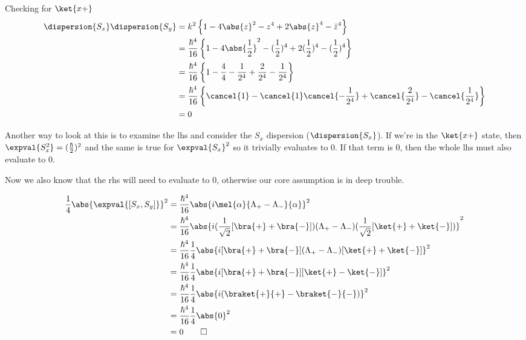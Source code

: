 \begin{answer}
\begin{answerpart}{Checking for \texorpdfstring{$\ket{x+}$}{|x+>}}
    \begin{equation}
      \begin{split}
        \dispersion{S_x}\dispersion{S_y}
        &=
        k^2
        \left\{
        1
        - 4\abs{z}^2
        - z^4 + 2\abs{z}^4 - \bar{z}^4
        \right\}
        \\
        &=
        \frac{\hbar^4}{16}        
        \left\{
        1
        - 4\abs{\frac{1}{2}}^2
        - (\frac{1}{2})^4 + 2(\frac{1}{2})^4 - (\frac{1}{2})^4
        \right\}
        \\
        &=
        \frac{\hbar^4}{16}
        \left\{
        1
        - \frac{4}{4}
        - \frac{1}{2^4} + \frac{2}{2^4} - \frac{1}{2^4}
        \right\}
        \\
        &=
        \frac{\hbar^4}{16}
        \left\{
        \cancel{1}
        - \cancel{1}
        \cancel{- \frac{1}{2^4}} + \cancel{\frac{2}{2^4}} - \cancel{\frac{1}{2^4}}
        \right\}
        \\
        &= 0\\
      \end{split}
    \end{equation}

    Another way to look at this is to examine the \ac{lhs} and
    consider the $S_x$ dispersion ($\dispersion{S_x}$).  If we're in
    the $\ket{x+}$ state, then $\expval{S_x^2} = (\frac{\hbar}{2})^2$
    and the same is true for $\expval{S_x}^2$ so it trivially
    evaluates to 0.  If that term is 0, then the whole \ac{lhs} must
    also evaluate to 0.

    Now we also know that the \ac{rhs} will need to evaluate to 0,
    otherwise our core assumption is in deep trouble.

    \begin{equation}
      \begin{split}
        \frac{1}{4}\abs{\expval{[S_x, S_y]}}^2
        &=
        \frac{\hbar^4}{16}
        \abs{i\mel{\alpha}{\Lambda_+ - \Lambda_-}{\alpha}}^2\\
        &=
        \frac{\hbar^4}{16}
        \abs{i
          (\frac{1}{\sqrt{2}} [\bra{+} + \bra{-}])
          (\Lambda_+ - \Lambda_-)
          (\frac{1}{\sqrt{2}} [\ket{+} + \ket{-}])
          }^2\\
        &=
        \frac{\hbar^4}{16}
        \frac{1}{4}
        \abs{i
          [\bra{+} + \bra{-}]
          (\Lambda_+ - \Lambda_-)
          [\ket{+} + \ket{-}]
          }^2\\
        &=
        \frac{\hbar^4}{16}
        \frac{1}{4}
        \abs{i
          [\bra{+} + \bra{-}]
          [\ket{+} - \ket{-}]
          }^2\\
        &=
        \frac{\hbar^4}{16}
        \frac{1}{4}
        \abs{i(\braket{+}{+} - \braket{-}{-})}^2\\
        &=
        \frac{\hbar^4}{16}
        \frac{1}{4}
        \abs{0}^2\\
        &= 0\qed\\
      \end{split}
    \end{equation}


\end{answerpart}
\end{answer}
